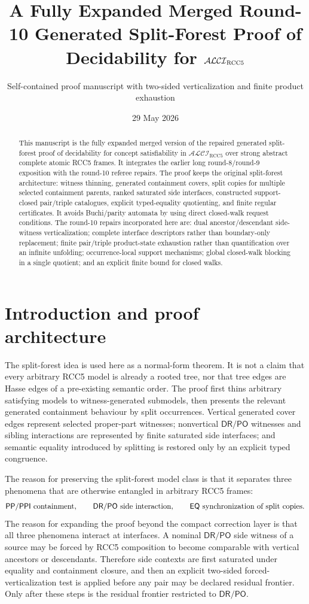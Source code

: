 \documentclass[11pt]{article}
\title{A Fully Expanded Merged Round-10 Generated Split-Forest Proof of Decidability for $\Logic$}
\author{Self-contained proof manuscript with two-sided verticalization and finite product exhaustion}
\date{29 May 2026}
\newcommand{\Logic}{\mathcal{ALCI}_{\mathrm{RCC5}}}
\newcommand{\EQ}{\mathsf{EQ}}
\newcommand{\DR}{\mathsf{DR}}
\newcommand{\PO}{\mathsf{PO}}
\newcommand{\PP}{\mathsf{PP}}
\newcommand{\PPI}{\mathsf{PPI}}
\begin{document}
\maketitle

\begin{abstract}
This manuscript is the fully expanded merged version of the repaired generated split-forest proof of decidability for concept satisfiability in $\Logic$ over strong abstract complete atomic RCC5 frames.  It integrates the earlier long round-8/round-9 exposition with the round-10 referee repairs.  The proof keeps the original split-forest architecture: witness thinning, generated containment covers, split copies for multiple selected containment parents, ranked saturated side interfaces, constructed support-closed pair/triple catalogues, explicit typed-equality quotienting, and finite regular certificates.  It avoids Buchi/parity automata by using direct closed-walk request conditions.  The round-10 repairs incorporated here are: dual ancestor/descendant side-witness verticalization; complete interface descriptors rather than boundary-only replacement; finite pair/triple product-state exhaustion rather than quantification over an infinite unfolding; occurrence-local support mechanisms; global closed-walk blocking in a single quotient; and an explicit finite bound for closed walks.
\end{abstract}

\tableofcontents

\section{Introduction and proof architecture}

The split-forest idea is used here as a normal-form theorem.  It is not a claim that every arbitrary RCC5 model is already a rooted tree, nor that tree edges are Hasse edges of a pre-existing semantic order.  The proof first thins arbitrary satisfying models to witness-generated submodels, then presents the relevant generated containment behaviour by split occurrences.  Vertical generated cover edges represent selected proper-part witnesses; nonvertical $\DR/\PO$ witnesses and sibling interactions are represented by finite saturated side interfaces; and semantic equality introduced by splitting is restored only by an explicit typed congruence.

The reason for preserving the split-forest model class is that it separates three phenomena that are otherwise entangled in arbitrary RCC5 frames:
\[
  \PP/\PPI\hbox{ containment},\qquad
  \DR/\PO\hbox{ side interaction},\qquad
  \EQ\hbox{ synchronization of split copies}.
\]
The reason for expanding the proof beyond the compact correction layer is that all three phenomena interact at interfaces.  A nominal $\DR/\PO$ side witness of a source may be forced by RCC5 composition to become comparable with vertical ancestors or descendants.  Therefore side contexts are first saturated under equality and containment closure, and then an explicit two-sided forced-verticalization test is applied before any pair may be declared residual frontier.  Only after these steps is the residual frontier restricted to $\DR/\PO$.
\end{document}
